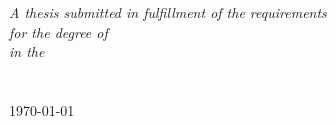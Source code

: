 \begin{titlepage}
\begin{center}
\large \textit{A thesis submitted in fulfillment of the requirements\\ for the degree of \degreename}\\[0.3cm] %
\textit{in the}\\[0.4cm]
\groupname\\\deptname\\[2cm] %
 
{\large \today}\\[4cm] %
 
\vfill
\end{center}
\end{titlepage}






\tableofcontents


\mainmatter %

\pagestyle{thesis} %

\adjustmtc













